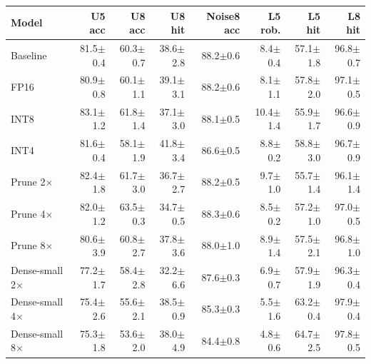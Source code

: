 \begin{tabular}{lrrrrrrr}
\toprule
Model & U5 acc & U8 acc & U8 hit & Noise8 acc & L5 rob. & L5 hit & L8 hit \\
\midrule
Baseline & 81.5{\scriptsize$\pm$0.4} & 60.3{\scriptsize$\pm$0.7} & 38.6{\scriptsize$\pm$2.8} & 88.2{\scriptsize$\pm$0.6} & 8.4{\scriptsize$\pm$0.4} & 57.1{\scriptsize$\pm$1.8} & 96.8{\scriptsize$\pm$0.7} \\
\midrule
FP16 & 80.9{\scriptsize$\pm$0.8} & 60.1{\scriptsize$\pm$1.1} & 39.1{\scriptsize$\pm$3.1} & 88.2{\scriptsize$\pm$0.6} & 8.1{\scriptsize$\pm$1.1} & 57.8{\scriptsize$\pm$2.0} & 97.1{\scriptsize$\pm$0.5} \\
INT8 & 83.1{\scriptsize$\pm$1.2} & 61.8{\scriptsize$\pm$1.4} & 37.1{\scriptsize$\pm$3.0} & 88.1{\scriptsize$\pm$0.5} & 10.4{\scriptsize$\pm$1.4} & 55.9{\scriptsize$\pm$1.7} & 96.6{\scriptsize$\pm$0.9} \\
INT4 & 81.6{\scriptsize$\pm$0.4} & 58.1{\scriptsize$\pm$1.9} & 41.8{\scriptsize$\pm$3.4} & 86.6{\scriptsize$\pm$0.5} & 8.8{\scriptsize$\pm$0.2} & 58.8{\scriptsize$\pm$3.0} & 96.7{\scriptsize$\pm$0.9} \\
\midrule
Prune 2$\times$ & 82.4{\scriptsize$\pm$1.8} & 61.7{\scriptsize$\pm$3.0} & 36.7{\scriptsize$\pm$2.7} & 88.2{\scriptsize$\pm$0.5} & 9.7{\scriptsize$\pm$1.0} & 55.7{\scriptsize$\pm$1.4} & 96.1{\scriptsize$\pm$1.4} \\
Prune 4$\times$ & 82.0{\scriptsize$\pm$1.2} & 63.5{\scriptsize$\pm$0.3} & 34.7{\scriptsize$\pm$0.5} & 88.3{\scriptsize$\pm$0.6} & 8.5{\scriptsize$\pm$0.2} & 57.2{\scriptsize$\pm$1.0} & 97.0{\scriptsize$\pm$0.5} \\
Prune 8$\times$ & 80.6{\scriptsize$\pm$3.9} & 60.8{\scriptsize$\pm$2.7} & 37.8{\scriptsize$\pm$3.6} & 88.0{\scriptsize$\pm$1.0} & 8.9{\scriptsize$\pm$1.4} & 57.5{\scriptsize$\pm$2.1} & 96.8{\scriptsize$\pm$1.0} \\
\midrule
Dense-small 2$\times$ & 77.2{\scriptsize$\pm$1.7} & 58.4{\scriptsize$\pm$2.8} & 32.2{\scriptsize$\pm$6.6} & 87.6{\scriptsize$\pm$0.3} & 6.9{\scriptsize$\pm$0.7} & 57.9{\scriptsize$\pm$1.9} & 96.3{\scriptsize$\pm$0.4} \\
Dense-small 4$\times$ & 75.4{\scriptsize$\pm$2.6} & 55.6{\scriptsize$\pm$2.1} & 38.5{\scriptsize$\pm$0.9} & 85.3{\scriptsize$\pm$0.3} & 5.5{\scriptsize$\pm$1.6} & 63.2{\scriptsize$\pm$0.4} & 97.9{\scriptsize$\pm$0.4} \\
Dense-small 8$\times$ & 75.3{\scriptsize$\pm$1.8} & 53.6{\scriptsize$\pm$2.0} & 38.0{\scriptsize$\pm$4.9} & 84.4{\scriptsize$\pm$0.8} & 4.8{\scriptsize$\pm$0.6} & 64.7{\scriptsize$\pm$2.5} & 97.8{\scriptsize$\pm$0.5} \\

\end{tabular}
